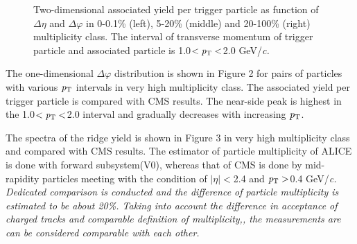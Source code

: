 \documentclass[ALICE,manyauthors]{cernphprep}
\begin{document}
\begin{figure}
	\centering
	\caption{ Two-dimensional associated yield per trigger particle as function of $\Delta\eta$ and $\Delta\varphi$ in 0-0.1\% (left), 5-20\% (middle) and 20-100\% (right) multiplicity class. The interval of transverse momentum of trigger particle and associated particle is 1.0$<\it{p}_{\rm{T}}<$2.0 GeV/\it{c}\rm{}. }

\end{figure}

The one-dimensional $\Delta\varphi$ distribution is shown in Figure 2 for pairs of particles with various $\it{p}_{\rm{T}}$ intervals in very high multiplicity class. The associated yield per trigger particle is compared with CMS results. The near-side peak is highest in the 1.0$<\it{p}_{\rm{T}}<$2.0 interval and gradually decreases with increasing $\it{p}_{\rm{T}}$.

The spectra of the ridge yield is shown in Figure 3 in very high multiplicity class and compared with CMS results. The estimator of particle multiplicity of ALICE is done with forward subsystem(V0), whereas that of CMS is done by mid-rapidity particles meeting with the condition of $|\eta|<$2.4 and $\it{p}_{\rm{T}}>$0.4 GeV/\it{c}\rm{}. Dedicated comparison is conducted and the difference of particle multiplicity is estimated to be about 20\%. Taking into account the difference in acceptance of charged tracks and comparable definition of multiplicity,, the measurements are can be considered comparable with each other.
\end{document}
